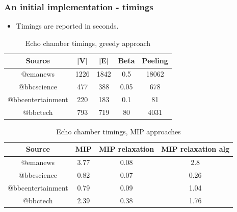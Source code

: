 \documentclass{beamer}
\begin{document}
\begin{frame}[c]
	\frametitle{An initial implementation - timings}
	\begin{itemize}
		\item Timings are reported in seconds.
	\end{itemize}

	\begin{table}[htpb]
		\centering
		\caption{Echo chamber timings, greedy approach}
		\begin{tabular}{c|c|c|c|c}
			\textbf{Source}     & {|V|}  & {|E|}  & Beta & Peeling \\
			\hline

			{@emanews}          & {1226} & {1842} & 0.5  & 18062   \\
			{@bbcscience}       & {477}  & {388}  & 0.05 & 678     \\
			{@bbcentertainment} & {220}  & {183}  & 0.1
			                    & 81                               \\
			{@bbctech}          & {793}  & {719}  & 80
			                    & 4031                             \\
		\end{tabular} \end{table}
	\begin{table}[htpb]
		\centering
		\caption{Echo chamber timings, MIP approaches}
		\begin{tabular}{c|c|c|c}
			\textbf{Source}     & MIP  & MIP relaxation &
			MIP relaxation alg                                 \\
			\hline
			{@emanews}          & 3.77 & 0.08           & 2.8  \\
			{@bbcscience}       & 0.82 & 0.07           & 0.26 \\
			{@bbcentertainment} & 0.79 & 0.09           & 1.04 \\
			{@bbctech}          & 2.39 & 0.38           & 1.76 \\
		\end{tabular}
	\end{table}
\end{frame}
\end{document}
